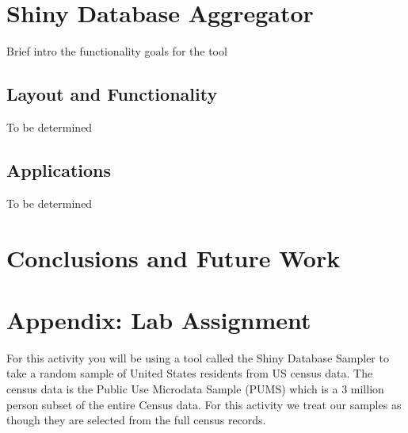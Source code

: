 \documentclass{article}\usepackage[]{graphicx}\usepackage[]{color}
\newcommand{\km}[1]{{\color{Orange} #1}}
\begin{document}


\newpage

\section{Shiny Database Aggregator}
Brief intro the functionality goals for the tool


\subsection{Layout and Functionality}
To be determined

\subsection{Applications}
To be determined



\section{Conclusions and Future Work}





\newpage
\appendix
\section{Appendix: Lab Assignment}
\label{labappend}

For this activity you will be using a tool called the Shiny Database Sampler to take a random sample of United States residents from US census data. The census data is the Public Use Microdata Sample (PUMS) which is a 3 million person subset of the entire Census data.  For this activity we treat our samples as though they are selected from the full census records.  \\ 
	
\end{document}
